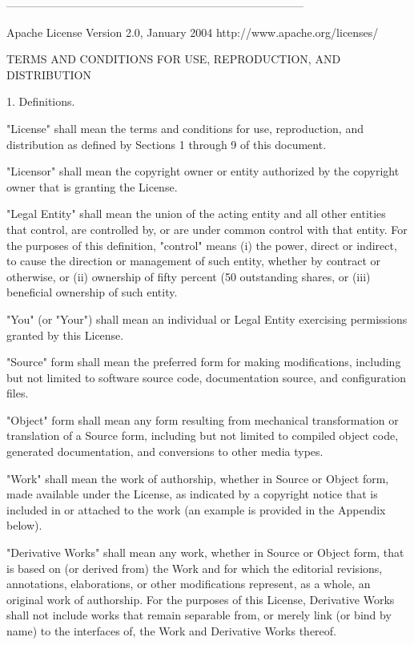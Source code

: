 \documentclass[parskip=half]{scrartcl}
\begin{document}
--------------------------------------------------------------------------------

                                 Apache License
                           Version 2.0, January 2004
                        http://www.apache.org/licenses/

   TERMS AND CONDITIONS FOR USE, REPRODUCTION, AND DISTRIBUTION

   1. Definitions.

      "License" shall mean the terms and conditions for use, reproduction,
      and distribution as defined by Sections 1 through 9 of this document.

      "Licensor" shall mean the copyright owner or entity authorized by
      the copyright owner that is granting the License.

      "Legal Entity" shall mean the union of the acting entity and all
      other entities that control, are controlled by, or are under common
      control with that entity. For the purposes of this definition,
      "control" means (i) the power, direct or indirect, to cause the
      direction or management of such entity, whether by contract or
      otherwise, or (ii) ownership of fifty percent (50%
      outstanding shares, or (iii) beneficial ownership of such entity.

      "You" (or "Your") shall mean an individual or Legal Entity
      exercising permissions granted by this License.

      "Source" form shall mean the preferred form for making modifications,
      including but not limited to software source code, documentation
      source, and configuration files.

      "Object" form shall mean any form resulting from mechanical
      transformation or translation of a Source form, including but
      not limited to compiled object code, generated documentation,
      and conversions to other media types.

      "Work" shall mean the work of authorship, whether in Source or
      Object form, made available under the License, as indicated by a
      copyright notice that is included in or attached to the work
      (an example is provided in the Appendix below).

      "Derivative Works" shall mean any work, whether in Source or Object
      form, that is based on (or derived from) the Work and for which the
      editorial revisions, annotations, elaborations, or other modifications
      represent, as a whole, an original work of authorship. For the purposes
      of this License, Derivative Works shall not include works that remain
      separable from, or merely link (or bind by name) to the interfaces of,
      the Work and Derivative Works thereof.
\end{document}

